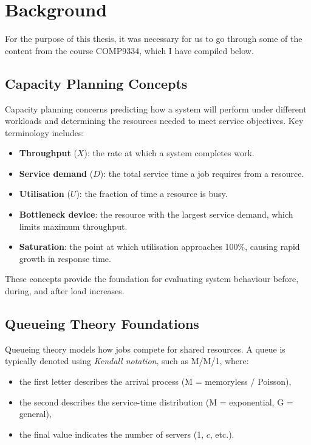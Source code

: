 \chapter{Background}\label{ch:background}

For the purpose of this thesis, it was necessary for us to go through some of the content from the course COMP9334, which I have compiled below.

\section{Capacity Planning Concepts}

Capacity planning concerns predicting how a system will perform under
different workloads and determining the resources needed to meet service
objectives. Key terminology includes:

\begin{itemize}
    \item \textbf{Throughput} ($X$): the rate at which a system completes work.
    \item \textbf{Service demand} ($D$): the total service time a job
          requires from a resource.
    \item \textbf{Utilisation} ($U$): the fraction of time a resource is busy.
    \item \textbf{Bottleneck device}: the resource with the largest
          service demand, which limits maximum throughput.
    \item \textbf{Saturation}: the point at which utilisation approaches
          100\%, causing rapid growth in response time.
\end{itemize}

These concepts provide the foundation for evaluating system behaviour
before, during, and after load increases.

\section{Queueing Theory Foundations}

Queueing theory models how jobs compete for shared resources. A queue is
typically denoted using \emph{Kendall notation}, such as M/M/1, where:

\begin{itemize}
    \item the first letter describes the arrival process (M = memoryless / Poisson),
    \item the second describes the service-time distribution 
          (M = exponential, G = general),
    \item the final value indicates the number of servers (1, $c$, etc.).
\end{itemize}

